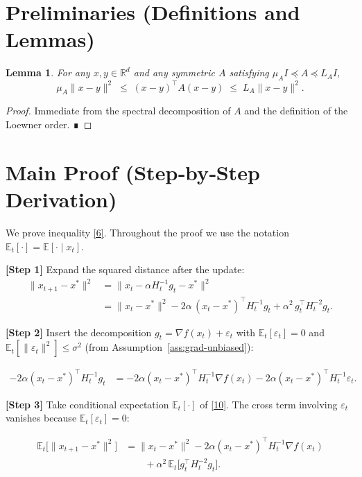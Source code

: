 \documentclass{article}
\newcommand{\E}{\mathbb{E}}
\newcommand{\R}{\mathbb{R}}
\newtheorem{lemma}{Lemma}
\begin{document}
\section*{Preliminaries (Definitions and Lemmas)}
\begin{lemma}\label{lem:quadratic-bound}
For any $x,y\in\R^{d}$ and any symmetric $A$ satisfying $\mu_{A} I\preceq A\preceq L_{A} I$,
\[
\mu_{A}\|x-y\|^{2}\;\le\;(x-y)^{\!\top}A(x-y)\;\le\;L_{A}\|x-y\|^{2}.
\tag{9}
\]
\end{lemma}
\begin{proof}
Immediate from the spectral decomposition of $A$ and the definition of the Loewner order. ∎
\end{proof}

\section*{Main Proof (Step‑by‑Step Derivation)}
We prove inequality \eqref{6}.  Throughout the proof we use the notation $\E_t[\cdot]=\E[\cdot\mid x_t]$.

\noindent\textbf{[Step 1]} Expand the squared distance after the update:
\[
\begin{aligned}
\|x_{t+1}-x^{*}\|^{2}
&=\bigl\|x_t-\alpha H_t^{-1}g_t-x^{*}\bigr\|^{2}        \\
&=\|x_t-x^{*}\|^{2}
      -2\alpha\,(x_t-x^{*})^{\!\top}H_t^{-1}g_t
      +\alpha^{2}\,g_t^{\!\top}H_t^{-2}g_t .
\end{aligned}
\tag{10}
\]

\noindent\textbf{[Step 2]} Insert the decomposition $g_t=\nabla f(x_t)+\varepsilon_t$ with $\E_t[\varepsilon_t]=0$ and $\E_t[\|\varepsilon_t\|^{2}]\le\sigma^{2}$ (from Assumption~\ref{ass:grad-unbiased}):

\[
\begin{aligned}
-2\alpha (x_t-x^{*})^{\!\top}H_t^{-1}g_t
&= -2\alpha (x_t-x^{*})^{\!\top}H_t^{-1}\nabla f(x_t)
   -2\alpha (x_t-x^{*})^{\!\top}H_t^{-1}\varepsilon_t .
\end{aligned}
\tag{11}
\]

\noindent\textbf{[Step 3]} Take conditional expectation $\E_t[\cdot]$ of \eqref{10}.  The cross term involving $\varepsilon_t$ vanishes because $\E_t[\varepsilon_t]=0$:

\[
\begin{aligned}
\E_t\!\bigl[\|x_{t+1}-x^{*}\|^{2}\bigr]
&= \|x_t-x^{*}\|^{2}
   -2\alpha (x_t-x^{*})^{\!\top}H_t^{-1}\nabla f(x_t)    \\
&\qquad +\alpha^{2}\,
   \E_t\!\bigl[g_t^{\!\top}H_t^{-2}g_t\bigr] .
\end{aligned}
\tag{12}
\]
\end{document}
